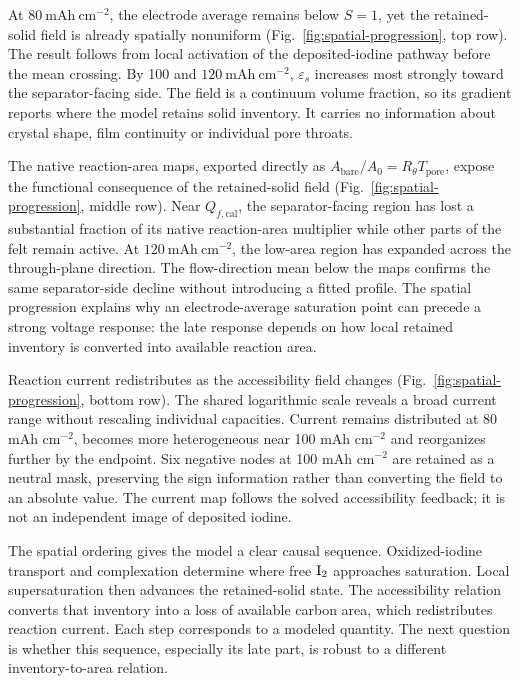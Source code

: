 \documentclass[11pt]{article}
\begin{document}
At $80~\mathrm{mAh~cm^{-2}}$, the electrode average remains below $S=1$, yet the retained-solid field is already spatially nonuniform (Fig.~\ref{fig:spatial-progression}, top row). The result follows from local activation of the deposited-iodine pathway before the mean crossing. By 100 and $120~\mathrm{mAh~cm^{-2}}$, $\varepsilon_s$ increases most strongly toward the separator-facing side. The field is a continuum volume fraction, so its gradient reports where the model retains solid inventory. It carries no information about crystal shape, film continuity or individual pore throats.

The native reaction-area maps, exported directly as $A_{\mathrm{bare}}/A_0=R_\theta T_{\mathrm{pore}}$, expose the functional consequence of the retained-solid field (Fig.~\ref{fig:spatial-progression}, middle row). Near $Q_{f,\mathrm{cal}}$, the separator-facing region has lost a substantial fraction of its native reaction-area multiplier while other parts of the felt remain active. At $120~\mathrm{mAh~cm^{-2}}$, the low-area region has expanded across the through-plane direction. The flow-direction mean below the maps confirms the same separator-side decline without introducing a fitted profile. The spatial progression explains why an electrode-average saturation point can precede a strong voltage response: the late response depends on how local retained inventory is converted into available reaction area.

Reaction current redistributes as the accessibility field changes (Fig.~\ref{fig:spatial-progression}, bottom row). The shared logarithmic scale reveals a broad current range without rescaling individual capacities. Current remains distributed at 80 mAh cm$^{-2}$, becomes more heterogeneous near 100 mAh cm$^{-2}$ and reorganizes further by the endpoint. Six negative nodes at 100 mAh cm$^{-2}$ are retained as a neutral mask, preserving the sign information rather than converting the field to an absolute value. The current map follows the solved accessibility feedback; it is not an independent image of deposited iodine.

The spatial ordering gives the model a clear causal sequence. Oxidized-iodine transport and complexation determine where free $\ce{I2}$ approaches saturation. Local supersaturation then advances the retained-solid state. The accessibility relation converts that inventory into a loss of available carbon area, which redistributes reaction current. Each step corresponds to a modeled quantity. The next question is whether this sequence, especially its late part, is robust to a different inventory-to-area relation.
\end{document}
